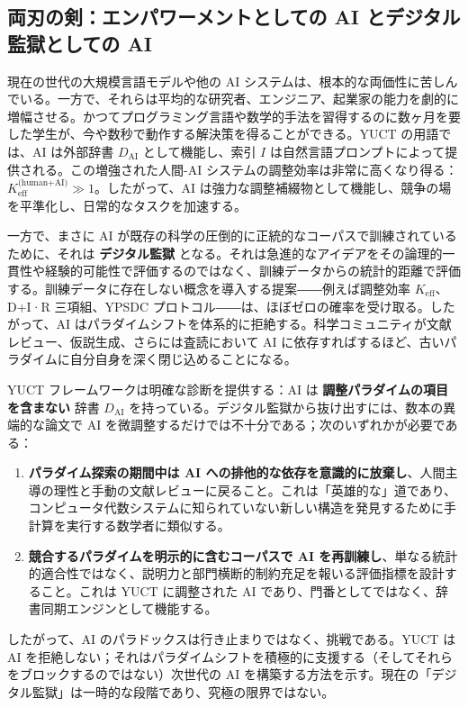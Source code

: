 \documentclass[12pt,a4paper]{article}
\begin{document}
	\subsection{両刃の剣：エンパワーメントとしての AI とデジタル監獄としての AI}
	
	現在の世代の大規模言語モデルや他の AI システムは、根本的な両価性に苦しんでいる。一方で、それらは平均的な研究者、エンジニア、起業家の能力を劇的に増幅させる。かつてプログラミング言語や数学的手法を習得するのに数ヶ月を要した学生が、今や数秒で動作する解決策を得ることができる。YUCT の用語では、AI は外部辞書 \(D_{\text{AI}}\) として機能し、索引 \(I\) は自然言語プロンプトによって提供される。この増強された人間-AI システムの調整効率は非常に高くなり得る：\(K_{\mathrm{eff}}^{\text{(human+AI)}} \gg 1\)。したがって、AI は強力な調整補綴物として機能し、競争の場を平準化し、日常的なタスクを加速する。
	
	一方で、まさに AI が既存の科学の圧倒的に正統的なコーパスで訓練されているために、それは \textbf{デジタル監獄} となる。それは急進的なアイデアをその論理的一貫性や経験的可能性で評価するのではなく、訓練データからの統計的距離で評価する。訓練データに存在しない概念を導入する提案――例えば調整効率 \(K_{\mathrm{eff}}\)、D+I·R 三項組、YPSDC プロトコル――は、ほぼゼロの確率を受け取る。したがって、AI はパラダイムシフトを体系的に拒絶する。科学コミュニティが文献レビュー、仮説生成、さらには査読において AI に依存すればするほど、古いパラダイムに自分自身を深く閉じ込めることになる。
	
	YUCT フレームワークは明確な診断を提供する：AI は \textbf{調整パラダイムの項目を含まない} 辞書 \(D_{\text{AI}}\) を持っている。デジタル監獄から抜け出すには、数本の異端的な論文で AI を微調整するだけでは不十分である；次のいずれかが必要である：
	
	\begin{enumerate}
		\item \textbf{パラダイム探索の期間中は AI への排他的な依存を意識的に放棄し}、人間主導の理性と手動の文献レビューに戻ること。これは「英雄的な」道であり、コンピュータ代数システムに知られていない新しい構造を発見するために手計算を実行する数学者に類似する。
		\item \textbf{競合するパラダイムを明示的に含むコーパスで AI を再訓練し}、単なる統計的適合性ではなく、説明力と部門横断的制約充足を報いる評価指標を設計すること。これは YUCT に調整された AI であり、門番としてではなく、辞書同期エンジンとして機能する。
	\end{enumerate}
	
	したがって、AI のパラドックスは行き止まりではなく、挑戦である。YUCT は AI を拒絶しない；それはパラダイムシフトを積極的に支援する（そしてそれらをブロックするのではない）次世代の AI を構築する方法を示す。現在の「デジタル監獄」は一時的な段階であり、究極の限界ではない。
	
\end{document}

